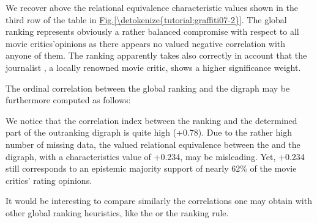 \documentclass[a4paper,10pt,english]{sphinxhowto}
\begin{document}
We recover above the relational equivalence characteristic values shown in the third row of the table in \hyperref[\detokenize{tutorial:graffiti07-2}]{Fig.\@ \ref{\detokenize{tutorial:graffiti07-2}}}. The global  ranking represents obviously a rather balanced compromise with respect to all movie critics’opinions as there appears no valued negative correlation with anyone of them. The  ranking apparently takes also correctly in account that the journalist , a locally renowned movie critic, shows a higher significance weight.

The ordinal correlation between the global  ranking and the digraph  may be furthermore computed as follows:

\begin{sphinxVerbatim}[commandchars=\\\{\},numbers=left,firstnumber=1,stepnumber=1]
\end{sphinxVerbatim}

We notice that the correlation  index between the  ranking and the determined part of the outranking digraph is quite high (+0.78). Due to the rather high number of missing data, the  \sphinxhyphen{}valued relational equivalence between the  and the  digraph, with a characteristics value of  +0.234, may be misleading. Yet, +0.234 still corresponds to an epistemic majority support of nearly 62\% of the movie critics’ rating opinions.

It would be interesting to compare similarly the correlations one may obtain with other global ranking heuristics, like the  or the  ranking rule.
\end{document}
